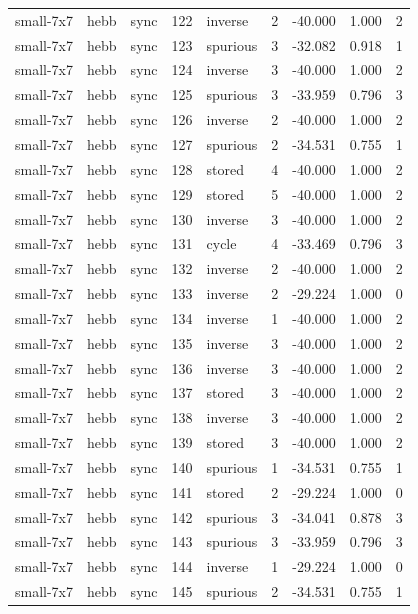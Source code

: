 \begin{tabular}{lllrlrrrr}
small-7x7 & hebb & sync & 122 & inverse & 2 & -40.000 & 1.000 & 2 \\
small-7x7 & hebb & sync & 123 & spurious & 3 & -32.082 & 0.918 & 1 \\
small-7x7 & hebb & sync & 124 & inverse & 3 & -40.000 & 1.000 & 2 \\
small-7x7 & hebb & sync & 125 & spurious & 3 & -33.959 & 0.796 & 3 \\
small-7x7 & hebb & sync & 126 & inverse & 2 & -40.000 & 1.000 & 2 \\
small-7x7 & hebb & sync & 127 & spurious & 2 & -34.531 & 0.755 & 1 \\
small-7x7 & hebb & sync & 128 & stored & 4 & -40.000 & 1.000 & 2 \\
small-7x7 & hebb & sync & 129 & stored & 5 & -40.000 & 1.000 & 2 \\
small-7x7 & hebb & sync & 130 & inverse & 3 & -40.000 & 1.000 & 2 \\
small-7x7 & hebb & sync & 131 & cycle & 4 & -33.469 & 0.796 & 3 \\
small-7x7 & hebb & sync & 132 & inverse & 2 & -40.000 & 1.000 & 2 \\
small-7x7 & hebb & sync & 133 & inverse & 2 & -29.224 & 1.000 & 0 \\
small-7x7 & hebb & sync & 134 & inverse & 1 & -40.000 & 1.000 & 2 \\
small-7x7 & hebb & sync & 135 & inverse & 3 & -40.000 & 1.000 & 2 \\
small-7x7 & hebb & sync & 136 & inverse & 3 & -40.000 & 1.000 & 2 \\
small-7x7 & hebb & sync & 137 & stored & 3 & -40.000 & 1.000 & 2 \\
small-7x7 & hebb & sync & 138 & inverse & 3 & -40.000 & 1.000 & 2 \\
small-7x7 & hebb & sync & 139 & stored & 3 & -40.000 & 1.000 & 2 \\
small-7x7 & hebb & sync & 140 & spurious & 1 & -34.531 & 0.755 & 1 \\
small-7x7 & hebb & sync & 141 & stored & 2 & -29.224 & 1.000 & 0 \\
small-7x7 & hebb & sync & 142 & spurious & 3 & -34.041 & 0.878 & 3 \\
small-7x7 & hebb & sync & 143 & spurious & 3 & -33.959 & 0.796 & 3 \\
small-7x7 & hebb & sync & 144 & inverse & 1 & -29.224 & 1.000 & 0 \\
small-7x7 & hebb & sync & 145 & spurious & 2 & -34.531 & 0.755 & 1 \\

\end{tabular}
